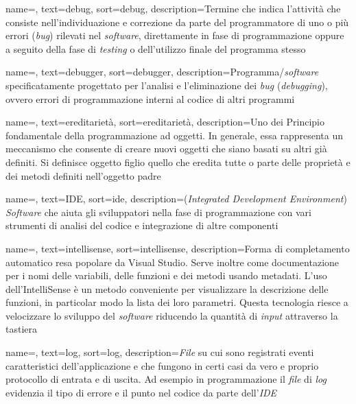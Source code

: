 {
    name=,
    text=debug,
    sort=debug,
    description={Termine che indica l’attività che
    consiste nell’individuazione e correzione da parte del programmatore di uno o più
    errori (\textit{bug}) rilevati nel \textit{software}, direttamente in fase di programmazione oppure
    a seguito della fase di \textit{testing} o dell’utilizzo finale del programma stesso \cite{site:wiki}}
}

{
    name=,
    text=debugger,
    sort=debugger,
    description={Programma/\textit{software} specificatamente
    progettato per l’analisi e l’eliminazione dei \textit{bug} (\textit{debugging}), ovvero errori di
    programmazione interni al codice di altri programmi \cite{site:wiki}}
}

{
    name=,
    text=ereditarietà,
    sort=ereditarietà,
    description={Uno dei Principio fondamentale della programmazione ad oggetti. In
    generale, essa rappresenta un meccanismo che consente di creare nuovi oggetti
    che siano basati su altri già definiti. Si definisce oggetto figlio 
    quello che eredita tutte o parte delle proprietà e dei metodi definiti nell’oggetto
    padre \cite{site:wiki}}
}

{
    name=,
    text=IDE,
    sort=ide,
    description={(\textit{Integrated Development Environment})
    \textit{Software} che aiuta gli sviluppatori nella fase di programmazione con vari strumenti
    di analisi del codice e integrazione di altre componenti \cite{site:wiki}}
}

{
    name=,
    text=intellisense,
    sort=intellisense,
    description={Forma di completamento automatico resa popolare da Visual Studio.
    Serve inoltre come documentazione per i
    nomi delle variabili, delle funzioni e dei metodi usando metadati. L’uso
    dell’IntelliSense è un metodo conveniente per visualizzare la descrizione delle
    funzioni, in particolar modo la lista dei loro parametri. Questa tecnologia riesce
    a velocizzare lo sviluppo del \textit{software} riducendo la quantità di \textit{input} attraverso
    la tastiera \cite{site:wiki}}
}

{
    name=,
    text=log,
    sort=log,
    description={\textit{File} su cui sono registrati eventi caratteristici dell’applicazione e che fungono
    in certi casi da vero e proprio protocollo di entrata e di uscita. Ad esempio in
    programmazione il \textit{file} di \textit{log} evidenzia il tipo di errore e il punto nel codice
    da parte dell’\textit{IDE} \cite{site:wiki}}
}

